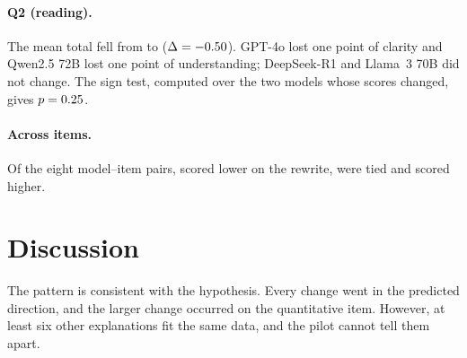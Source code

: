 \documentclass[11pt]{article}
\begin{document}
\paragraph{Q2 (reading).} The mean total fell from \QTwoMeanF{} to \QTwoMeanU{} ($\Delta = -0.50$). GPT-4o lost one point of clarity and Qwen2.5 72B lost one point of understanding; DeepSeek-R1 and Llama~3 70B did not change. The sign test, computed over the two models whose scores changed, gives $p = 0.25$.

\paragraph{Across items.} Of the eight model--item pairs, \AllNumLower{} scored lower on the rewrite, \AllNumTied{} were tied and \AllNumHigher{} scored higher.

\section{Discussion}
\label{sec:discussion}

The pattern is consistent with the hypothesis. Every change went in the predicted direction, and the larger change occurred on the quantitative item. However, at least six other explanations fit the same data, and the pilot cannot tell them apart.
\end{document}
